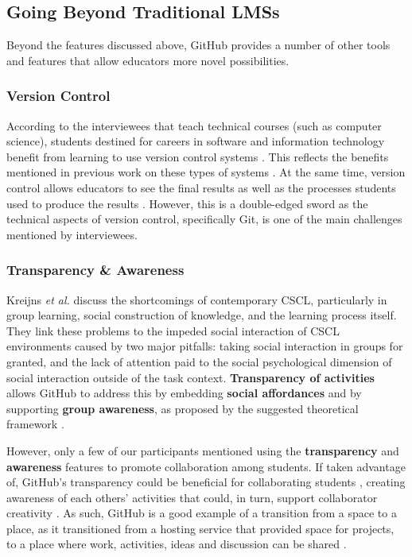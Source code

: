 \subsection{Going Beyond Traditional LMSs}
Beyond the features discussed above, GitHub provides a number of other tools and features that allow educators more novel possibilities.

\subsubsection{Version Control}
According to the interviewees that teach technical courses (such as computer science), students destined for careers in software and information technology benefit from learning to use version control systems \cite{britton2013using}. This reflects the benefits mentioned in previous work on these types of systems \cite{reid2005learning}. At the same time, version control allows educators to see the final results as well as the processes students used to produce the results \cite{glassy2006using}. However, this is a double-edged sword as the technical aspects of version control, specifically Git, is one of the main challenges mentioned by interviewees.


\subsubsection{Transparency \& Awareness}
Kreijns \textit{et al.} \cite{kreijns2013social} discuss the shortcomings of contemporary CSCL, particularly in group learning, social construction of knowledge, and the learning process itself. They link these problems to the impeded social interaction of CSCL environments caused by two major pitfalls: taking social interaction in groups for granted, and the lack of attention paid to the social psychological dimension of social interaction outside of the task context. \textbf{Transparency of activities} allows GitHub to address this by embedding \textbf{social affordances} and by supporting \textbf{group awareness}, as proposed by the suggested theoretical framework \cite{kreijns2002sociability}.

However, only a few of our participants mentioned using the \textbf{transparency} and \textbf{awareness} features to promote collaboration among students. If taken advantage of, GitHub's transparency could be beneficial for collaborating students \cite{dalsgaard2009transparency}, creating awareness of each others' activities that could, in turn, support collaborator creativity \cite{farooq2007supporting}. As such, GitHub is a good example of a transition from a space to a place, as it transitioned from a hosting service that provided space for projects, to a place where work, activities, ideas and discussion can be shared \cite{dourish1992awareness}.
\\ %

